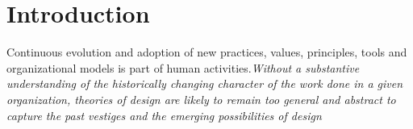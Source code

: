 \documentclass{ICED-Paper}%
\begin{document}

\section{Introduction}

Continuous evolution and adoption of new practices, values, principles, tools and organizational models is part of human activities.\emph{Without a substantive understanding of the historically changing character of the work done in a given organization, theories of design are likely to remain too general and abstract to capture the past vestiges and the emerging possibilities of design}\cite{ExpansiveDesign}
\end{document}
